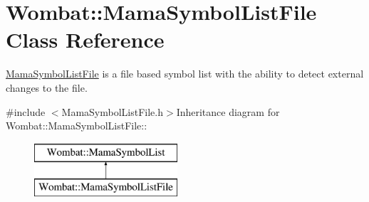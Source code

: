 \hypertarget{classWombat_1_1MamaSymbolListFile}{
\section{Wombat::MamaSymbolListFile Class Reference}
\label{classWombat_1_1MamaSymbolListFile}
}


\hyperlink{classWombat_1_1MamaSymbolListFile}{MamaSymbolListFile} is a file based symbol list with the ability to detect external changes to the file.  


{\ttfamily \#include $<$MamaSymbolListFile.h$>$}Inheritance diagram for Wombat::MamaSymbolListFile::\begin{figure}[H]
\begin{center}
\leavevmode
\includegraphics[height=2cm]{classWombat_1_1MamaSymbolListFile}
\end{center}
\end{figure}
